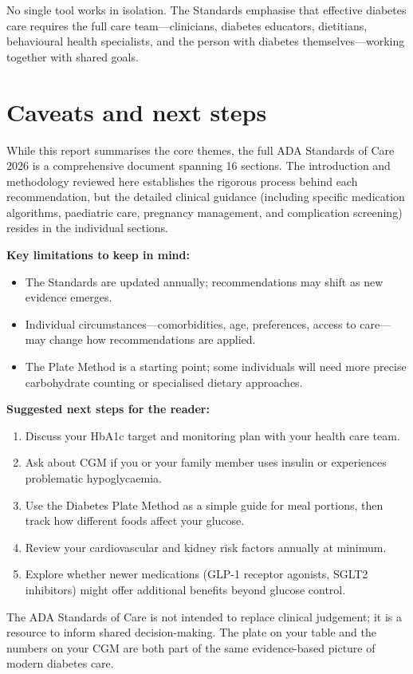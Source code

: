 \documentclass[11pt,a4paper]{article}
\begin{document}
No single tool works in isolation. The Standards emphasise that effective
diabetes care requires the full care team---clinicians, diabetes educators,
dietitians, behavioural health specialists, and the person with diabetes
themselves---working together with shared goals.

\section{Caveats and next steps}

While this report summarises the core themes, the full ADA Standards of Care
2026 is a comprehensive document spanning 16 sections. The introduction and
methodology reviewed here establishes the rigorous process behind each
recommendation, but the detailed clinical guidance (including specific
medication algorithms, paediatric care, pregnancy management, and
complication screening) resides in the individual sections.

\textbf{Key limitations to keep in mind:}

\begin{itemize}
  \item The Standards are updated annually; recommendations may shift as new
        evidence emerges.
  \item Individual circumstances---comorbidities, age, preferences, access
        to care---may change how recommendations are applied.
  \item The Plate Method is a starting point; some individuals will need
        more precise carbohydrate counting or specialised dietary approaches.
\end{itemize}

\textbf{Suggested next steps for the reader:}

\begin{enumerate}
  \item Discuss your HbA1c target and monitoring plan with your health care
        team.
  \item Ask about CGM if you or your family member uses insulin or
        experiences problematic hypoglycaemia.
  \item Use the Diabetes Plate Method as a simple guide for meal portions,
        then track how different foods affect your glucose.
  \item Review your cardiovascular and kidney risk factors annually at
        minimum.
  \item Explore whether newer medications (GLP-1 receptor agonists, SGLT2
        inhibitors) might offer additional benefits beyond glucose control.
\end{enumerate}

The ADA Standards of Care is not intended to replace clinical judgement; it
is a resource to inform shared decision-making. The plate on your table and
the numbers on your CGM are both part of the same evidence-based picture of
modern diabetes care.
\end{document}
